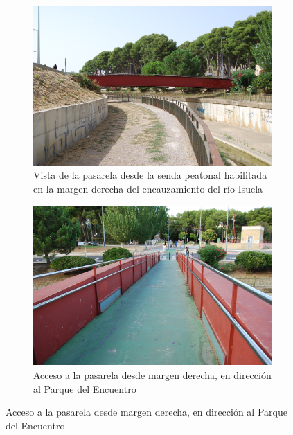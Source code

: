 \documentclass[a4paper,11pt ]{xc_webpage_project}
\renewcommand{\widhtLeftCol}{0.50\textwidth} %
\renewcommand{\widhtRigthCol}{0.45\textwidth} %
\begin{document}
\begin{figure}[h]
  \begin{subfigure}[l]{\widhtLeftCol}
  \centering
  \includegraphics[width=\textwidth]{figures/DSC_0321}
  \caption{Vista de la pasarela desde la senda peatonal habilitada en la margen derecha del encauzamiento del río Isuela}
  \end{subfigure}
\hfill
  \begin{subfigure}[r]{\widhtRigthCol}
  \centering
  \includegraphics[width=\textwidth]{figures/DSC_0312}
  \caption{Acceso a la  pasarela desde margen derecha, en dirección al Parque del Encuentro}
  \end{subfigure}
  \end{figure}
\end{document}
